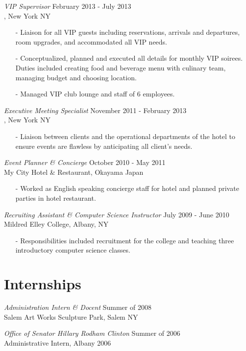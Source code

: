 \documentclass{res} %
\begin{document}
\begin{resume}
{\sl VIP Supervisor} \hfill February 2013 - July 2013\\
\sheraton, New York NY
\begin{itemize}
\item[-] Liaison for all VIP guests including reservations, arrivals and departures, room upgrades, and accommodated all VIP needs.
\item[-] Conceptualized, planned and executed all details for monthly VIP soirees. Duties included creating food and beverage menu with culinary team, managing budget and choosing location.
\item[-] Managed VIP club lounge and staff of 6 employees.
\end{itemize}

{\sl Executive Meeting Specialist} \hfill November 2011 - February 2013\\
\sheraton, New York NY
\begin{itemize}
\item[-] Liaison between clients and the operational departments of the hotel to ensure events are flawless by anticipating all client's needs.
\end{itemize}

{\sl Event Planner \& Concierge} \hfill October 2010 - May 2011 \\
My City Hotel \& Restaurant, Okayama Japan
\begin{itemize}
\item[-] Worked as English speaking concierge staff for hotel and planned private parties in hotel restaurant.
\end{itemize}

{\sl Recruiting Assistant \& Computer Science Instructor} \hfill July 2009 - June 2010 \\
Mildred Elley College, Albany, NY
\begin{itemize}
\item[-] Responsibilities included recruitment for the college and teaching three introductory computer science classes.
\end{itemize}

\section{Internships} \vspace{15pt}

{\sl Administration Intern \& Docent} \hfill Summer of 2008 \\
Salem Art Works Sculpture Park, Salem NY

{\sl Office of Senator Hillary Rodham Clinton} \hfill Summer of 2006 \\
Administrative Intern, Albany 2006

\end{resume}
\end{document}

